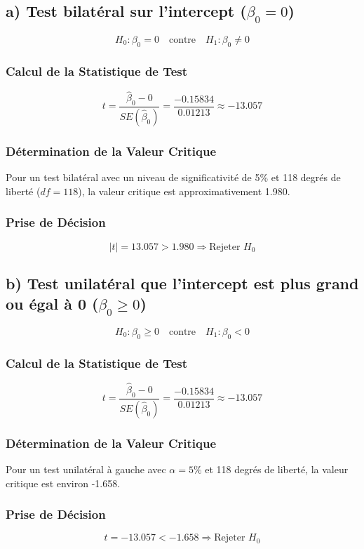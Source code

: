 \documentclass[14pt]{extarticle} %
\theoremstyle{definition}
\theoremstyle{plain}
\begin{document}
\subsection*{a) Test bilatéral sur l'intercept (\(\beta_0 = 0\))}
\[
H_0 : \beta_0 = 0 \quad \text{contre} \quad H_1 : \beta_0 \neq 0
\]

\subsubsection*{Calcul de la Statistique de Test}
\[
t = \frac{\hat{\beta}_0 - 0}{SE(\hat{\beta}_0)} = \frac{-0.15834}{0.01213} \approx -13.057
\]

\subsubsection*{Détermination de la Valeur Critique}
Pour un test bilatéral avec un niveau de significativité de 5\% et 118 degrés de liberté (\(df = 118\)), la valeur critique est approximativement 1.980.

\subsubsection*{Prise de Décision}
\[
|t| = 13.057 > 1.980 \Rightarrow \text{Rejeter } H_0
\]


\subsection*{b) Test unilatéral que l’intercept est plus grand ou égal à 0 (\(\beta_0 \geq 0\))}
\[
H_0 : \beta_0 \geq 0 \quad \text{contre} \quad H_1 : \beta_0 < 0
\]

\subsubsection*{Calcul de la Statistique de Test}
\[
t = \frac{\hat{\beta}_0 - 0}{SE(\hat{\beta}_0)} = \frac{-0.15834}{0.01213} \approx -13.057
\]

\subsubsection*{Détermination de la Valeur Critique}
Pour un test unilatéral à gauche avec \(\alpha = 5\%\) et 118 degrés de liberté, la valeur critique est environ -1.658.

\subsubsection*{Prise de Décision}
\[
t = -13.057 < -1.658 \Rightarrow \text{Rejeter } H_0
\]
\end{document}
